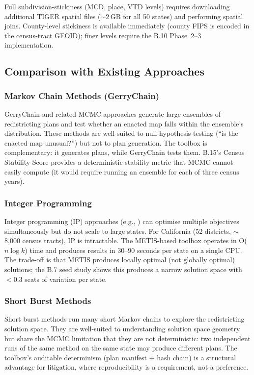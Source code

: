 Full subdivision-stickiness (MCD, place, VTD levels) requires downloading
additional TIGER spatial files ($\sim$2\,GB for all 50 states) and performing
spatial joins.
County-level stickiness is available immediately (county FIPS is encoded in the
census-tract GEOID); finer levels require the B.10 Phase~2--3 implementation.

\subsection{Comparison with Existing Approaches}

\subsubsection*{Markov Chain Methods (GerryChain)}

GerryChain \citep{metric2018} and related MCMC approaches generate large ensembles
of redistricting plans and test whether an enacted map falls within the ensemble's
distribution.
These methods are well-suited to null-hypothesis testing (``is the enacted map
unusual?'') but not to plan generation.
The toolbox is complementary: it generates plans, while GerryChain tests them.
B.15's Census Stability Score provides a deterministic stability metric that
MCMC cannot easily compute (it would require running an ensemble for each of
three census years).

\subsubsection*{Integer Programming}

Integer programming (IP) approaches (e.g., \citet{gurnee2021}) can optimise
multiple objectives simultaneously but do not scale to large states.
For California (52 districts, $\sim$8,000 census tracts), IP is intractable.
The METIS-based toolbox operates in O($n \log k$) time and produces results
in 30--90 seconds per state on a single CPU.
The trade-off is that METIS produces locally optimal (not globally optimal)
solutions; the B.7 seed study shows this produces a narrow solution space
with $< 0.3$ seats of variation per state.

\subsubsection*{Short Burst Methods}

Short burst methods \citep{cannon2023} run many short Markov chains to
explore the redistricting solution space.
They are well-suited to understanding solution space geometry but share the
MCMC limitation that they are not deterministic: two independent runs of the
same method on the same state may produce different plans.
The toolbox's auditable determinism (plan manifest + hash chain) is a
structural advantage for litigation, where reproducibility is a requirement,
not a preference.

